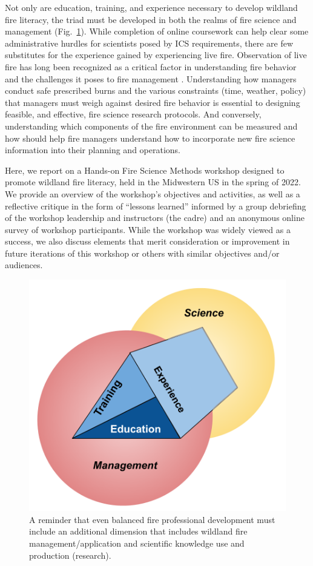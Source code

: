 \documentclass[fire,article,submit,moreauthors,pdftex]{Definitions/mdpi}
\begin{document}
Not only are education, training, and experience necessary to develop wildland fire literacy, the triad must be developed in both the realms of fire science and management (Fig.~\ref{ScienceManagement}).
While completion of online coursework can help clear some administrative hurdles for scientists posed by ICS requirements, there are few substitutes for the experience gained by experiencing live fire.
Observation of live fire has long been recognized as a critical factor in understanding fire behavior and the challenges it poses to fire management \citep{alexander1990, andrews1989}.
Understanding how managers conduct safe prescribed burns and the various constraints (time, weather, policy) that managers must weigh against desired fire behavior is essential to designing feasible, and effective, fire science research protocols.
And conversely, understanding which components of the fire environment can be measured and how should help fire managers understand how to incorporate new fire science information into their planning and operations.

Here, we report on a Hands-on Fire Science Methods workshop designed to promote wildland fire literacy, held in the Midwestern US in the spring of 2022.
We provide an overview of the workshop's objectives and activities, as well as a reflective critique in the form of ``lessons learned'' informed by a group debriefing of the workshop leadership and instructors (the cadre) and an anonymous online survey of workshop participants.
While the workshop was widely viewed as a success, we also discuss elements that merit consideration or improvement in future iterations of this workshop or others with similar objectives and/or audiences.

\begin{figure}
\centering
\includegraphics[width=0.5\columnwidth]{ScienceManagementTent.png}
\caption{\label{ScienceManagement}A reminder that even balanced fire professional development must include an additional dimension that includes wildland fire management/application and scientific knowledge use and production (research).}
\end{figure}
\end{document}
